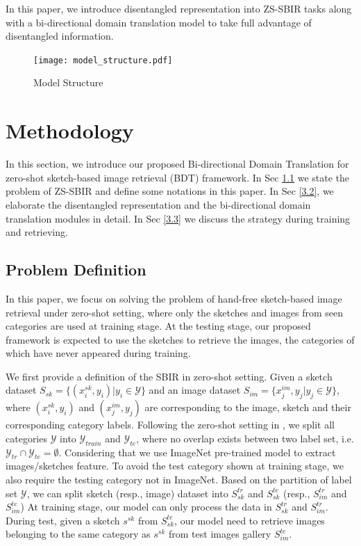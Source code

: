 \documentclass[10pt,twocolumn,letterpaper]{article}
\begin{document}
In this paper, we introduce disentangled representation into ZS-SBIR tasks along with a bi-directional domain translation model to take full advantage of disentangled information.


\begin{figure}
\begin{center}
\texttt{[image: model\_structure.pdf]}
\end{center}
   \caption{Model Structure}
\label{fig:structure}
\end{figure}

\section{Methodology}
In this section, we introduce our proposed Bi-directional Domain Translation for zero-shot sketch-based image retrieval (BDT) framework. In Sec \ref{3.1} we state the problem of ZS-SBIR and define some notations in this paper. In Sec \ref{3.2}, we elaborate the disentangled representation and the bi-directional domain translation modules in detail. In Sec \ref{3.3} we discuss the strategy during training and retrieving.

\subsection{Problem Definition} \label{3.1}
In this paper, we focus on solving the problem of hand-free sketch-based image retrieval under zero-shot setting, where only the sketches and images from seen categories are used at training stage. 
At the testing stage, our proposed framework is expected to use the sketches to retrieve the images, the categories of which have never appeared during training.

We first provide a definition of the SBIR in zero-shot setting. 
Given a sketch dataset $S_{sk}=\{(x_i^{sk}, y_i)|y_i \in \mathcal{Y}\}$ and an image dataset $S_{im}=\{x_j^{im}, y_j | y_j \in \mathcal{Y}\}$, where $(x_i^{sk}, y_i)$ and $(x_j^{im}, y_j)$ are corresponding to the image, sketch and their corresponding category labels.
Following the zero-shot setting in \cite{yelamarthi2018zero,wang2019stacked}, we split all categories $\mathcal{Y}$ into $\mathcal{Y}_{train}$ and $\mathcal{Y}_{te}$, where no overlap exists between two label set, i.e. $\mathcal{Y}_{tr} \cap \mathcal{Y}_{te} = \emptyset$. Considering that we use ImageNet pre-trained model to extract images/sketches feature. To avoid the test category shown at training stage, we also require the testing category not in ImageNet.
Based on the partition of label set $\mathcal{Y}$, we can split sketch (resp., image) dataset into $S^{tr}_{sk}$ and $S^{te}_{sk}$ (resp., $S^{tr}_{im}$ and $S^{te}_{im}$)
At training stage, our model can only process the data in $S^{tr}_{sk}$ and $S_{im}^{tr}$. 
During test, given a sketch $s^{sk}$ from $S^{te}_{sk}$, our model need to retrieve images belonging to the same category as $s^{sk}$ from test images gallery $S^{te}_{im}$.
\end{document}
